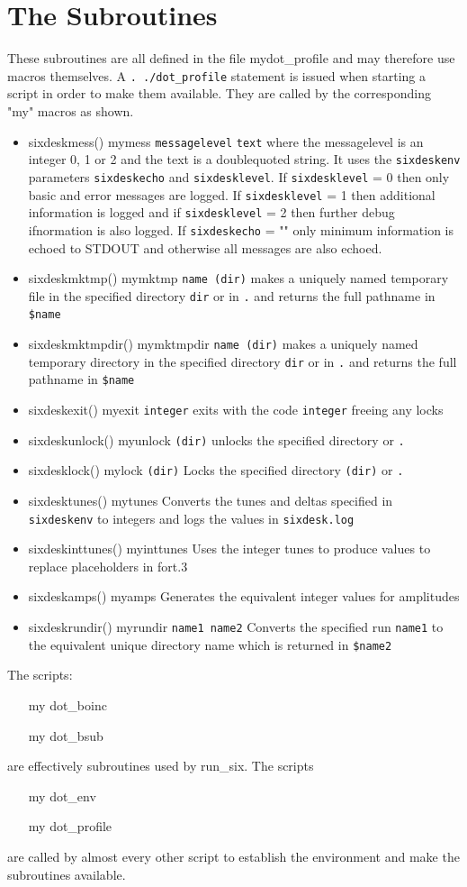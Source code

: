 \documentclass{article}    %
\begin{document}
\section{The Subroutines}
These subroutines are all defined in the file mydot\_profile
and may therefore use macros themselves. A {\tt . ./dot\_profile}
statement is issued when starting a script in order to make
them available.
They are called by the corresponding "my" macros as shown.
\begin{itemize}
\item sixdeskmess() mymess {\tt messagelevel} {\tt text}
where the messagelevel is an integer 0, 1 or 2 and the text is 
a doublequoted string. It uses the {\tt sixdeskenv} parameters 
{\tt sixdeskecho} and {\tt sixdesklevel}. 
If {\tt sixdesklevel} =  0 then only basic and error messages are logged.
If {\tt sixdesklevel} = 1 then additional information is logged and if
{\tt sixdesklevel} = 2 then further debug ifnormation is also logged.
If {\tt sixdeskecho}  = "" only minimum information is echoed to STDOUT
and otherwise all messages are also echoed.
\item sixdeskmktmp() mymktmp {\tt name (dir)} makes a uniquely named temporary file in the 
specified directory {\tt dir} or in {\tt .} and returns the full pathname in {\tt \$name} 
\item sixdeskmktmpdir() mymktmpdir {\tt name (dir)} makes a uniquely named temporary directory
in the specified directory {\tt dir} or in {\tt .} and returns the full pathname in {\tt \$name}
\item sixdeskexit() myexit {\tt integer} exits with the code {\tt integer} freeing any locks
\item sixdeskunlock() myunlock {\tt (dir)} unlocks the specified directory or {\tt .}
\item sixdesklock() mylock {\tt (dir)} Locks the specified directory {\tt (dir)} or {\tt .}
\item sixdesktunes() mytunes Converts the tunes and deltas specified in {\tt sixdeskenv}
to integers and logs the values in {\tt sixdesk.log} 
\item sixdeskinttunes() myinttunes Uses the integer tunes to produce values to replace 
placeholders in fort.3
\item sixdeskamps() myamps Generates the equivalent integer values for amplitudes
\item sixdeskrundir() myrundir {\tt name1 name2} Converts the specified run {\tt name1}
to the equivalent unique directory name which is returned in {\tt \$name2} 
\end{itemize}
The scripts:
\begin{itemize}
\item [my]dot\_boinc
\item [my]dot\_bsub
\end{itemize}
are effectively subroutines used by run\_six. 
The scripts 
\begin{itemize}
\item [my]dot\_env
\item [my]dot\_profile
\end{itemize} 
are called by almost every other script to establish the environment
and make the subroutines available.
\end{document}
